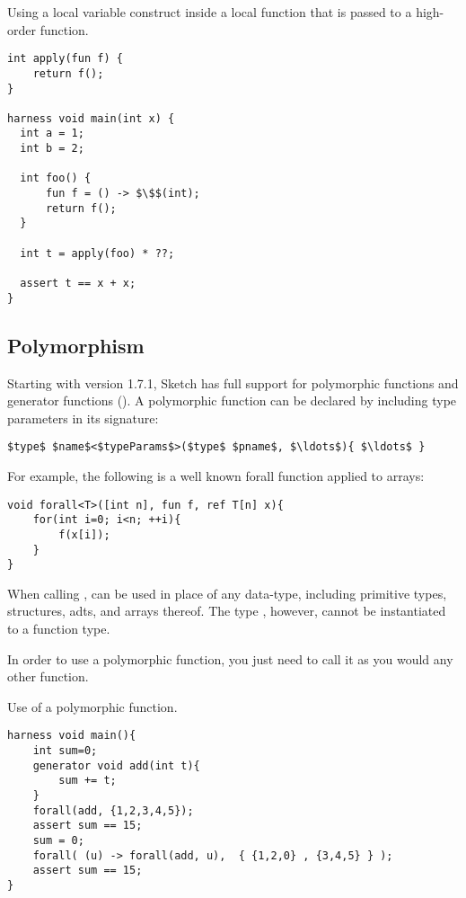 \begin{Example}
Using a local variable construct inside a local function that is passed to a high-order function.
\begin{lstlisting}
int apply(fun f) {
    return f();
}

harness void main(int x) {
  int a = 1;
  int b = 2;

  int foo() {
      fun f = () -> $\$$(int);
      return f();
  }

  int t = apply(foo) * ??;

  assert t == x + x;
}
\end{lstlisting}

\end{Example}

\subsection{Polymorphism}

Starting with version 1.7.1, Sketch has full support for polymorphic functions
and generator functions (). A polymorphic function can be declared by including type parameters in its signature:
\begin{lstlisting}
$type$ $name$<$typeParams$>($type$ $pname$, $\ldots$){ $\ldots$ }
\end{lstlisting}
%
For example, the following is a well known forall function applied to arrays:
%
\begin{lstlisting}
void forall<T>([int n], fun f, ref T[n] x){
    for(int i=0; i<n; ++i){
        f(x[i]);
    }
}
\end{lstlisting}

When calling ,  can be used in place of any data-type, including primitive types, structures, adts, and arrays thereof. The type , however, cannot be instantiated to a function type.

In order to use a polymorphic function, you just need to call it as you would any other function.

\begin{Example}
Use of a polymorphic function.
\begin{lstlisting}
harness void main(){
    int sum=0;
    generator void add(int t){
        sum += t;
    }
    forall(add, {1,2,3,4,5});
    assert sum == 15;
    sum = 0;
    forall( (u) -> forall(add, u),  { {1,2,0} , {3,4,5} } );
    assert sum == 15;
}
\end{lstlisting}
\end{Example}


